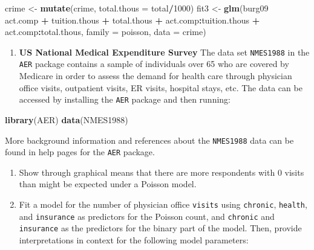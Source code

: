 \documentclass[
]{krantz}
\newenvironment{Shaded}{\begin{snugshade}}{\end{snugshade}}
\newcommand{\DataTypeTok}[1]{\textcolor[rgb]{0.27,0.27,0.27}{#1}}
\newcommand{\DecValTok}[1]{\textcolor[rgb]{0.06,0.06,0.06}{#1}}
\newcommand{\KeywordTok}[1]{\textcolor[rgb]{0.27,0.27,0.27}{\textbf{#1}}}
\newcommand{\NormalTok}[1]{#1}
\newcommand{\OperatorTok}[1]{\textcolor[rgb]{0.43,0.43,0.43}{\textbf{#1}}}
\newcommand{\StringTok}[1]{\textcolor[rgb]{0.5,0.5,0.5}{#1}}
\providecommand{\tightlist}{%
  \setlength{\itemsep}{0pt}\setlength{\parskip}{0pt}}
\begin{document}
\begin{Shaded}
\begin{Highlighting}[]
\NormalTok{crime <-}\StringTok{ }\KeywordTok{mutate}\NormalTok{(crime, }\DataTypeTok{total.thous =}\NormalTok{ total}\OperatorTok{/}\DecValTok{1000}\NormalTok{)}
\NormalTok{fit3 <-}\StringTok{ }\KeywordTok{glm}\NormalTok{(burg09 }\OperatorTok{~}\StringTok{ }\NormalTok{act.comp }\OperatorTok{+}\StringTok{ }\NormalTok{tuition.thous }\OperatorTok{+}\StringTok{ }\NormalTok{total.thous }\OperatorTok{+}
\StringTok{  }\NormalTok{act.comp}\OperatorTok{:}\NormalTok{tuition.thous }\OperatorTok{+}\StringTok{ }\NormalTok{act.comp}\OperatorTok{:}\NormalTok{total.thous, }\DataTypeTok{family =}\NormalTok{ poisson, }\DataTypeTok{data =}\NormalTok{ crime)}
\end{Highlighting}
\end{Shaded}

\begin{enumerate}
\def\labelenumi{\arabic{enumi}.}
\setcounter{enumi}{5}
\tightlist
\item
  \textbf{US National Medical Expenditure Survey} The data set \texttt{NMES1988} in the \texttt{AER} package contains a sample of individuals over 65 who are covered by Medicare in order to assess the demand for health care through physician office visits, outpatient visits, ER visits, hospital stays, etc. The data can be accessed by installing the \texttt{AER} package and then running:
\end{enumerate}

\begin{Shaded}
\begin{Highlighting}[]
\KeywordTok{library}\NormalTok{(AER)}
\KeywordTok{data}\NormalTok{(NMES1988)}
\end{Highlighting}
\end{Shaded}

More background information and references about the \texttt{NMES1988} data can be found in help pages for the \texttt{AER} package.

\begin{enumerate}
\def\labelenumi{\alph{enumi}.}
\tightlist
\item
  Show through graphical means that there are more respondents with 0 visits than might be expected under a Poisson model.
\item
  Fit a model for the number of physician office \texttt{visits} using \texttt{chronic}, \texttt{health}, and \texttt{insurance} as predictors for the Poisson count, and \texttt{chronic} and \texttt{insurance} as the predictors for the binary part of the model. Then, provide interpretations in context for the following model parameters:
\end{enumerate}
\end{document}
